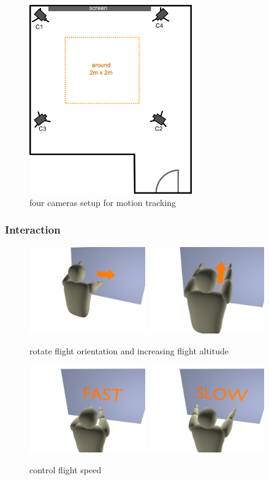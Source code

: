 \begin{figure}[!ht]
		\centering
		\includegraphics[width=7cm]{gfx/4cam-setup.png}
		\caption{four cameras setup for motion tracking}
		\label{fig:cam-setup}
\end{figure}


\subsubsection{Interaction}


\begin{figure}[!ht]
		\centering
		\includegraphics[width=5cm]{gfx/immi-fly-rotate.jpg}
		\qquad
		\includegraphics[width=5cm]{gfx/immi-fly-up.jpg}
		\caption{rotate flight orientation and increasing flight altitude}
		\label{fig:fly-rot-up}
\end{figure}

\begin{figure}[!ht]
		\centering
		\includegraphics[width=5cm]{gfx/immi-fly-fast.jpg}
		\qquad
		\includegraphics[width=5cm]{gfx/immi-fly-slow.jpg}
		\caption{control flight speed}
		\label{fig:fly-speed}
\end{figure}

%
